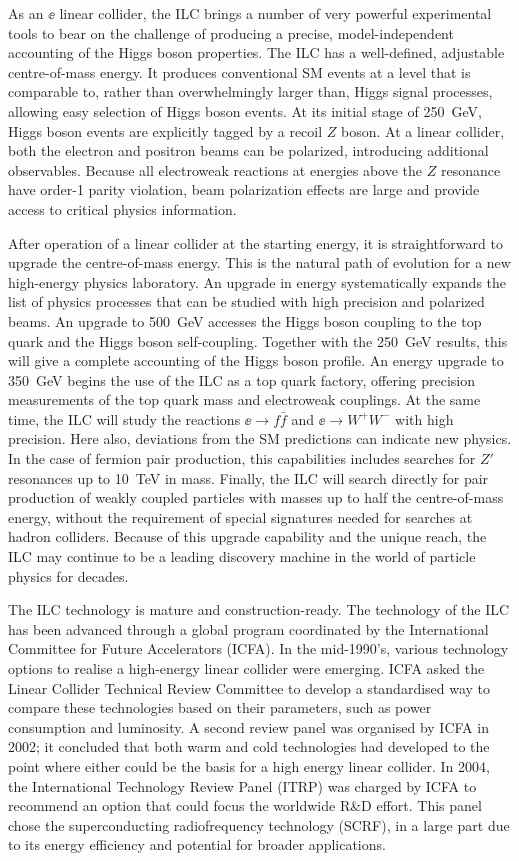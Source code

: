 As an $\ee$ linear  collider, the ILC brings a number of very powerful
experimental tools to bear on the challenge of producing a precise,
model-independent accounting of the Higgs boson properties.
The ILC has a well-defined, adjustable centre-of-mass energy.   It
produces conventional SM events at a level that is comparable to,
rather than overwhelmingly larger than, Higgs signal processes,
allowing easy selection of Higgs boson events.   At its initial stage
of 250~GeV, Higgs boson events are explicitly tagged by a recoil $Z$
boson.    At a linear collider, both the electron and positron beams
can be polarized, introducing additional observables.  Because all
electroweak  reactions at energies above the $Z$ resonance have
order-1  parity violation, beam polarization effects are large  and
provide access to critical physics information. 

After operation of a linear collider at the starting energy, it is
straightforward to upgrade the centre-of-mass energy.  This is the
natural path of evolution  for a new high-energy physics laboratory.
An upgrade in energy
systematically expands the list of physics processes that can be
studied with high precision and polarized beams.   An upgrade to
500~GeV
accesses the Higgs boson coupling to the top quark and the Higgs boson
self-coupling.  Together with the 250~GeV results, this  will give
 a complete accounting of the Higgs boson
profile.
An energy upgrade to 350~GeV begins the use of the ILC as a top quark
factory,
offering precision measurements of the top quark mass and electroweak
couplings.  At the same time, the ILC will study the reactions $\ee\to
f\bar f$ and $\ee\to W^+W^-$ with high precision.   Here also,
deviations from the SM predictions can indicate new physics.  In the
case of fermion pair production, this capabilities includes searches
for $Z'$ resonances up to 10~TeV in mass.   Finally, the ILC will
search directly for pair production of  weakly coupled particles  with
masses up to half
the centre-of-mass energy, without the requirement of special
signatures needed for searches at hadron colliders. 
Because of this upgrade capability and the unique reach, the ILC may
continue to be a leading discovery machine in the 
world of particle physics for decades.


The ILC technology is mature and construction-ready.   The technology
of the ILC has been advanced through a global program coordinated by
the International Committee for Future Accelerators
(ICFA).
In the mid-1990's, various technology options to
realise a high-energy linear collider were emerging. 
ICFA asked the 
Linear Collider Technical Review Committee to develop a standardised
way to  compare  these  technologies based on their parameters, such as
power consumption and luminosity. A second
review panel was organised by ICFA in 2002;
it concluded that both warm and cold technologies had
developed to the point where either could be the basis for a
high energy linear
collider. In 2004, the  International Technology Review Panel
(ITRP) was charged by ICFA to recommend an option that could focus the
worldwide R\&D effort.  This panel chose the  superconducting
radiofrequency technology (SCRF), in a large part due to its
energy efficiency and potential for broader applications. 

